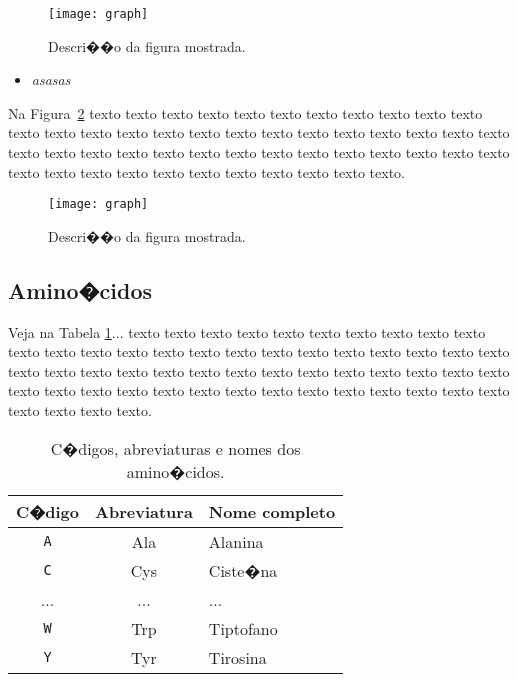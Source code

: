 \begin{figure}[!h]
  \centering
  \texttt{[image: graph]} 
  \caption{Descri��o da figura mostrada.}
  \label{fig:humanbeta} 
\end{figure}

\begin{itemize}
    \item \textit{asasas}
    
\end{itemize}



Na Figura~\ref{fig:humanbeta} texto texto texto texto texto texto texto texto
texto texto texto texto texto texto texto texto texto texto texto texto texto
texto texto texto texto texto texto texto texto texto texto texto texto texto
texto texto texto texto texto texto texto texto texto texto texto texto texto
texto texto texto.

\begin{figure}[!h]
  \centering
  \texttt{[image: graph]} 
  \caption{Descri��o da figura mostrada.}
  \label{fig:humanbeta} 
\end{figure}

\subsection{Amino�cidos}
\label{sec:amino_acidos}

Veja na Tabela \ref{tab:amino_acidos}...  texto texto texto texto texto texto
texto texto texto texto texto texto texto texto texto texto texto texto texto
texto texto texto texto texto texto texto texto texto texto texto texto texto
texto texto texto texto texto texto texto texto texto texto texto texto texto
texto texto texto texto texto texto texto texto texto texto texto.

\begin{table}[!t]
\begin{center}
    \begin{tabular}{c|c|l}
	 \hline
	 C�digo & Abreviatura & Nome completo \\ \hline
     \texttt{A} & Ala & Alanina \\
     \texttt{C} & Cys & Ciste�na \\
     ...        & ... & ... \\
     \texttt{W} & Trp & Tiptofano \\
     \texttt{Y} & Tyr & Tirosina \\ \hline
    \end{tabular}
  \caption{C�digos, abreviaturas e nomes dos amino�cidos.}
  \label{tab:amino_acidos}
\end{center}
\end{table}

